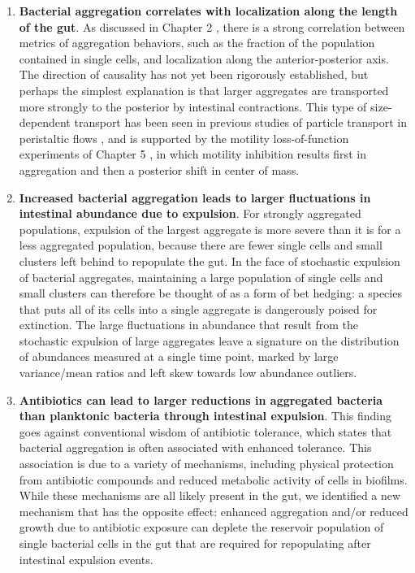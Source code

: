 \begin{enumerate}
\item 
\textbf{Bacterial aggregation correlates with localization along the length of the gut}. As discussed in Chapter 2 \cite{schlomann_bacterial_2018}, there is a strong correlation between metrics of aggregation behaviors, such as the fraction of the population contained in single cells, and localization along the anterior-posterior axis. The direction of causality has not yet been rigorously established, but perhaps the simplest explanation is that larger aggregates are transported more strongly to the posterior by intestinal contractions. This type of size-dependent transport has been seen in previous studies of particle transport in peristaltic flows \cite{Jimenez-Lozano2009}, and is supported by the motility loss-of-function experiments of Chapter 5 \cite{Wiles2019}, in which motility inhibition results first in aggregation and then a posterior shift in center of mass.

\item 
\textbf{Increased bacterial aggregation leads to larger fluctuations in intestinal abundance due to expulsion}. For strongly aggregated populations, expulsion of the largest aggregate is more severe than it is for a less aggregated population, because there are fewer single cells and small clusters left behind to repopulate the gut. In the face of stochastic expulsion of bacterial aggregates, maintaining a large population of single cells and small clusters can therefore be thought of as a form of bet hedging: a species that puts all of its cells into a single aggregate is dangerously poised for extinction. The large fluctuations in abundance that result from the stochastic expulsion of large aggregates leave a signature on the distribution of abundances measured at a single time point, marked by large variance/mean ratios and left skew towards low abundance outliers.

\item 
\textbf{Antibiotics can lead to larger reductions in aggregated bacteria than planktonic bacteria through intestinal expulsion}. This finding goes against conventional wisdom of antibiotic tolerance, which states that bacterial aggregation is often associated with enhanced tolerance. This association is due to a variety of mechanisms, including physical protection from antibiotic compounds and reduced metabolic activity of cells in biofilms. While these mechanisms are all likely present in the gut, we identified a new mechanism that has the opposite effect: enhanced aggregation and/or reduced growth due to antibiotic exposure can deplete the reservoir population of single bacterial cells in the gut that are required for repopulating after intestinal expulsion events.


\end{enumerate}
